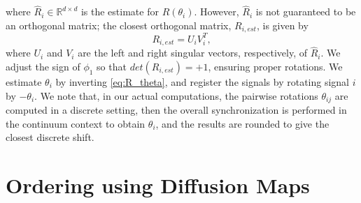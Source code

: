 \documentclass{pnastwo}
\begin{document}
\begin{article}
\begin{materials}
where $\hat{R}_i \in \mathbb{R}^{d \times d}$ is the estimate for $R(\theta_i)$.
%
However, $\hat{R}_i$ is not guaranteed to be an orthogonal matrix;
the closest orthogonal matrix, $R_{i, est}$, is given by
\begin{equation} \label{eq:R_est}
R_{i, est} = U_i V_i^T,
\end{equation}
where $U_i$ and $V_i$ are the left and right singular vectors, respectively, of $\hat{R}_i$.
%
We adjust the sign of $\phi_1$ so that $det(R_{i, est}) = +1$, ensuring proper rotations.
%
We estimate $\theta_{i}$ by inverting \eqref{eq:R_theta}, and register the signals by rotating signal $i$ by $-\theta_i$.
%
We note that, in our actual computations, the pairwise rotations $\theta_{ij}$ are computed in a discrete setting, then the overall
synchronization is performed in the continuum context to obtain $\theta_i$, and the results are rounded to give the closest
discrete shift.

%
%
%

\section{Ordering using Diffusion Maps \cite{coifman2005geometric}}


\end{materials}
\end{article}
\end{document}
